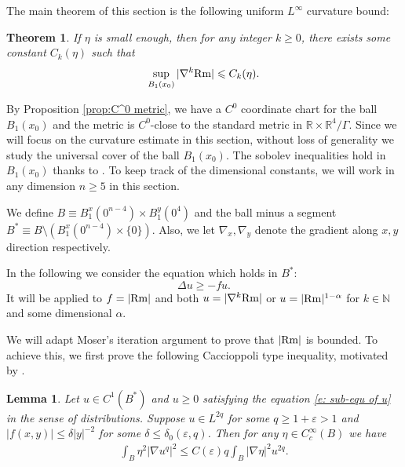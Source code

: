 \documentclass[11pt,reqno]{amsart}
\numberwithin{equation}{section}
\newcommand{\RR}{\mathds{R}}
\newcommand{\Rm}{{\rm Rm}}
\newtheorem{theorem}[thm]{Theorem}
\newtheorem{lemma}[thm]{Lemma}
\theoremstyle{definition}
\theoremstyle{remark}
\begin{document}
The main theorem of this section is the following uniform $L^{\infty}$ curvature bound:  
\begin{theorem}\label{t:bound on Rm}
If $\eta$ is small enough, then for any integer $k\ge0$, there exists some constant $C_k(\eta)$ such that
    \begin{equation}
        \sup_{B_1(x_0)}|\nabla^k\Rm| \leqslant C_k(\eta).
    \end{equation}
\end{theorem}

By Proposition \ref{prop:C^0 metric}, we have a $C^0$ coordinate chart for the ball $B_1(x_0)$ and the metric is $C^0$-close to the standard metric in $\RR \times \RR^4/\Gamma$. Since we will focus on the curvature estimate in this section, without loss of generality we study the universal cover of the ball $B_1(x_0)$. The sobolev inequalities hold in $B_1(x_0)$ thanks to \cite{cro}. To keep track of the dimensional constants, we will work in any dimension $n\ge 5$ in this section. 

We define $B \equiv B_1^x(0^{n-4}) \times B_1^y(0^4)$ and the ball minus a segment $B^* \equiv B \setminus (B_1^x(0^{n-4}) \times \{0\})$. Also, we let $\nabla_x, \nabla_y$ denote the gradient along $x, y$ direction respectively. 

In the following we consider the equation which holds in $B^*$: 
\begin{equation}\label{e: sub-equ of u}
    \Delta u \geqslant - f u. 
\end{equation}
It will be applied to $f= |\Rm|$ and both $u =|\nabla^k\Rm|$ or $u =|\Rm|^{1-\alpha}$ for $k\in\mathbb{N}$ and some dimensional $\alpha$. 

We will adapt Moser's iteration argument to prove that $|\Rm|$ is bounded. To achieve this, we first prove the following Caccioppoli type inequality, motivated by \cite{sib85}.


\begin{lemma}\label{l:Caccioppoli}
    Let $u \in C^1(B^*)$ and $u \geqslant 0$ satisfying the equation \eqref{e: sub-equ of u} in the sense of distributions. Suppose $u \in L^{2q}$ for some $q \geqslant 1 + \varepsilon >1$ and $|f(x,y) | \leqslant \delta |y|^{-2}$ for some $\delta \leqslant \delta_0(\varepsilon,q)$. Then for any $\eta \in C^{\infty}_c(B)$ we have
    \begin{align}\label{e:Cacchio-1}
        \int_B \eta^2 |\nabla u^q|^2 \leqslant C(\varepsilon) q \int_B |\nabla \eta|^2 u^{2q}.
    \end{align}
\end{lemma}
\end{document}

